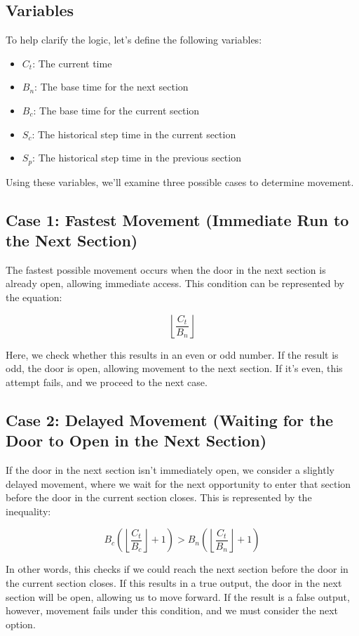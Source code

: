 \documentclass[a4paper,10pt,english]{scrartcl}
\begin{document}
\subsection*{Variables}
To help clarify the logic, let's define the following variables:
\begin{itemize}
    \item $C_t$: The current time
    \item $B_n$: The base time for the next section
    \item $B_c$: The base time for the current section
    \item $S_c$: The historical step time in the current section
    \item $S_p$: The historical step time in the previous section
\end{itemize}

Using these variables, we'll examine three possible cases to determine movement.

\subsection*{Case 1: Fastest Movement (Immediate Run to the Next Section)}
The fastest possible movement occurs when the door in the next section is already open, allowing immediate access. This condition can be represented by the equation:

\[
\left\lfloor\frac{C_t}{B_n}\right\rfloor
\]

Here, we check whether this results in an even or odd number. If the result is odd, the door is open, allowing movement to the next section. If it's even, this attempt fails, and we proceed to the next case.

\subsection*{Case 2: Delayed Movement (Waiting for the Door to Open in the Next Section)}
If the door in the next section isn't immediately open, we consider a slightly delayed movement, where we wait for the next opportunity to enter that section before the door in the current section closes. This is represented by the inequality:

\[
B_c\left(\left\lfloor\frac{C_t}{B_c}\right\rfloor+1\right) > B_n\left(\left\lfloor\frac{C_t}{B_n}\right\rfloor+1\right)
\]

In other words, this checks if we could reach the next section before the door in the current section closes. If this results in a true output, the door in the next section will be open, allowing us to move forward. If the result is a false output, however, movement fails under this condition, and we must consider the next option.
\end{document}
